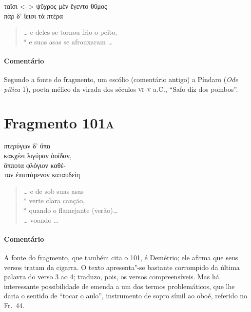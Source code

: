 {\begin{gkverse}
ταῖσι <–> ψῦχρος μὲν ἔγεντο θῦμος\\
πὰρ δ’ ἴεισι τὰ πτέρα
\end{gkverse}

\begin{verse}
\ldots{} e deles se tornou frio o peito,\\*
e suas asas se afrouxaram \ldots{}
\end{verse}

{\paragraph{Comentário} Segundo a fonte do fragmento, um escólio (comentário antigo) a Píndaro
(\textit{Ode pítica} 1), poeta mélico da virada dos séculos \textsc{vi}--\textsc{v} a.C.,
``Safo diz dos pombos”.}


\section{Fragmento 101\textsc{a}}

\begin{gkverse}
πτερύγων δ’ ὔπα\\
κακχέει λιγύραν ἀοίδαν,\\
ὄπποτα φλόγιον \dagger{}καθέ-\\
ταν\dagger{} ἐπιπτάμενον \dagger{}καταυδείη\dagger{}
\end{gkverse}

\begin{verse}
\ldots{} e de sob suas asas\\*
verte clara canção,\\*
quando o flamejante (verão)\ldots{}\\
\ldots{} voando \ldots{}
\end{verse}

{\paragraph{Comentário} A fonte do fragmento, que também cita o 101, é Demétrio; ele afirma que seus versos tratam da cigarra. O texto apresenta"-se bastante corrompido da última palavra do verso 3 ao 4; traduzo, pois, os versos compreensíveis. Mas há interessante possibilidade de emenda a um dos termos problemáticos, que lhe daria o sentido de ``tocar o aulo'', instrumento de sopro símil ao oboé, referido no Fr.~44.}



}
